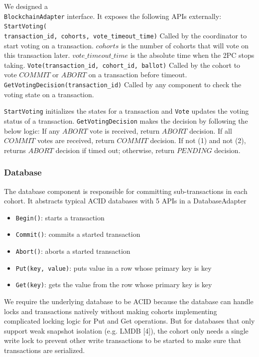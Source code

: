 \documentclass[11pt,conference]{IEEEtran}
\begin{document}
We designed a \texttt{\\BlockchainAdapter} interface. It exposes the following APIs externally:
\texttt{StartVoting(\\transaction\_id, cohorts, vote\_timeout\_time)} Called by the coordinator to start voting on a transaction. $cohorts$ is the number of cohorts that will vote on this transaction later. $vote\_timeout\_time$ is the absolute time when the 2PC stops taking.
\texttt{Vote(transaction\_id, cohort\_id, ballot)} Called by the cohort to vote $COMMIT$ or $ABORT$ on a transaction before timeout.
\texttt{GetVotingDecision(transaction\_id)} Called by any component to check the voting state on a transaction.

\texttt{StartVoting} initializes the states for a transaction and \texttt{Vote} updates the voting status of a transaction. \texttt{GetVotingDecision} makes the decision by following the below logic:
If any $ABORT$ vote is received, return $ABORT$ decision.
If all $COMMIT$ votes are received, return $COMMIT$ decision.
If not (1) and not (2), returns $ABORT$ decision if timed out; otherwise, return $PENDING$ decision.

\subsubsection{Database} \label{database}
The database component is responsible for committing sub-transactions in each cohort. It abstracts typical ACID databases with 5 APIs in a DatabaseAdapter 
\begin{itemize}
  \item \texttt{Begin()}:  starts a transaction
  \item \texttt{Commit()}: commits a started transaction
  \item \texttt{Abort()}: aborts a started transaction
  \item \texttt{Put(key, value)}: puts value in a row whose primary key is key 
  \item \texttt{Get(key)}: gets the value from the row whose primary key is key 
\end{itemize}






We require the underlying database to be ACID because the database can handle locks and transactions natively without making cohorts implementing complicated locking logic for Put and Get operations. But for databases that only support weak snapshot isolation (e.g. LMDB [4]), the cohort only needs a single write lock to prevent other write transactions to be started to make sure that transactions are serialized. 
\end{document}
